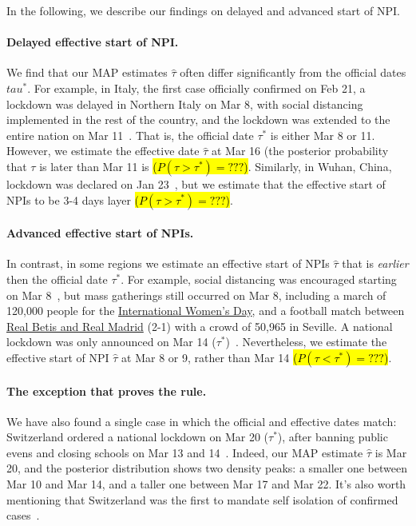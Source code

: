 \documentclass[12pt]{extarticle}
\begin{document}
In the following, we describe our findings on delayed and advanced start of NPI. 

\paragraph*{Delayed effective start of NPI.}
We find that our MAP estimates $\hat{\tau}$ often differ significantly from the official dates $tau^*$. 
For example, in Italy, the first case officially confirmed on Feb 21, a lockdown was delayed in Northern Italy on Mar 8, with social distancing implemented in the rest of the country, and the lockdown was extended to the entire nation on Mar 11~\citep{Gatto2020}.
That is, the official date $\tau^*$ is either Mar 8 or 11.
However, we estimate the effective date $\hat{\tau}$ at Mar 16 (the posterior probability that $\tau$ is later than Mar 11 is \hl{($P(\tau > \tau^*)=???$)}.
Similarly, in Wuhan, China, lockdown was declared on Jan 23~\citep{Li2020}, but we estimate that the effective start of NPIs to be 3-4 days layer \hl{($P(\tau > \tau^*)=???$)}.

\paragraph*{Advanced effective start of NPIs.}
In contrast, in some regions we estimate an effective start of NPIs $\hat{\tau}$ that is \emph{earlier} then the official date $\tau^*$.
For example, social distancing was encouraged starting on Mar 8~\citep{Flaxman2020}, but mass gatherings still occurred on Mar 8, including a march of 120,000 people for the \href{https://www.nytimes.com/2020/03/13/world/europe/spain-coronavirus-emergency.html}{International Women's Day}, and a  football match between \href{https://www.espn.com/soccer/match?gameId=550350}{Real Betis and Real Madrid} (2-1) with a crowd of 50,965 in Seville.
A national lockdown was only announced on Mar 14 ($\tau^*$)~\citep{Flaxman2020}.
Nevertheless, we estimate the effective start of NPI $\hat{\tau}$ at Mar 8 or 9, rather than Mar 14 \hl{($P(\tau < \tau^*)=???$)}.

\paragraph*{The exception that proves the rule.}
We have also found a single case in which the official and effective dates match: Switzerland ordered a national lockdown on Mar 20 ($\tau^*$), after banning public evens and closing schools on Mar 13 and 14~\citep{Flaxman2020}.
Indeed, our MAP estimate $\hat{\tau}$ is Mar 20, and the posterior distribution shows two density peaks: a smaller one between Mar 10 and Mar 14, and a taller one between Mar 17 and Mar 22. It's also worth mentioning that Switzerland was the first to mandate self isolation of confirmed cases~\citep{Flaxman2020}.
\end{document}
